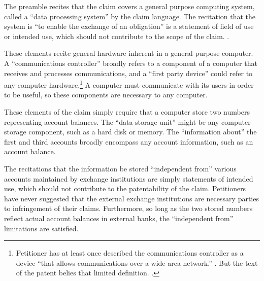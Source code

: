 \documentclass{scotus}
\begin{document}

The preamble recites that the claim covers a general purpose computing system,
called a ``data processing system'' by the claim language. The recitation that
the system is ``to enable the exchange of an obligation'' is a statement of
field of use or intended use, which should not contribute to the scope of the
claim.
.


These elements recite general hardware inherent in a general purpose computer. A
``communications controller'' broadly refers to a component of a computer that
receives and processes communications, and a ``first party device'' could refer
to any computer hardware.\footnote{Petitioner has at least once
described the communications controller as a device ``that allows communications
over a wide-area network.'' . But the text of the
patent belies that limited definition. .} A computer must communicate with its users in order to be useful,
so these components are necessary to any computer.


These elements of the claim simply require that a computer store two numbers
representing account balances. The ``data storage unit'' might be any computer
storage component, such as a hard disk or memory. The ``information about'' the
first and third accounts broadly encompass any account information, such as an
account balance.

The recitations that the information be stored ``independent from'' various
accounts maintained by exchange institutions are simply statements of intended
use, which should not contribute to the patentability of the claim. Petitioners
have never suggested that the external exchange institutions are necessary
parties to infringement of their claims. Furthermore, so long as the two stored
numbers reflect actual account balances in external banks, the ``independent
from'' limitations are satisfied.
\end{document}
